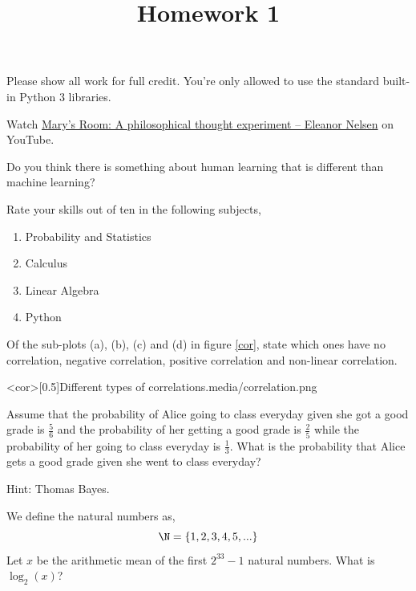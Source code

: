 \documentclass{homework}
\title{Homework 1}
\newcommand\marry{\href{%
    https://www.youtube.com/watch?v=mGYmiQkah4o%
  }{Mary's Room: A philosophical thought experiment -- Eleanor Nelsen}}
\begin{document}
 \maketitle

Please show all work for full credit. You're only allowed to use
the standard built-in Python 3 libraries.

\question Watch \marry{} on YouTube.

Do you think there is something about human learning that is
different than machine learning?


\question Rate your skills out of ten in the following subjects,
\begin{enumerate}
  \item Probability and Statistics
  \item Calculus
  \item Linear Algebra
  \item Python
\end{enumerate}


\question Of the sub-plots (a), (b), (c) and (d) in figure \ref{cor}, state
which ones have no correlation, negative correlation, positive
correlation and non-linear correlation.

\img<cor>[0.5]{Different types of correlations.}{media/correlation.png}


\question Assume that the probability of Alice going to class everyday given
she got a good grade is $\frac{5}{6}$ and the probability of her
getting a good grade is $\frac{2}{5}$ while the probability of her
going to class everyday is $\frac{1}{3}$. What is the probability
that Alice gets a good grade given she went to class everyday?

Hint: Thomas Bayes.


\question We define the natural numbers as,
\[
  \N = \{1, 2, 3, 4, 5, ...\}
\]
Let $x$ be the arithmetic mean of the first $2^{33}-1$ natural
numbers. What is $\log_2(x)$?
\end{document}
